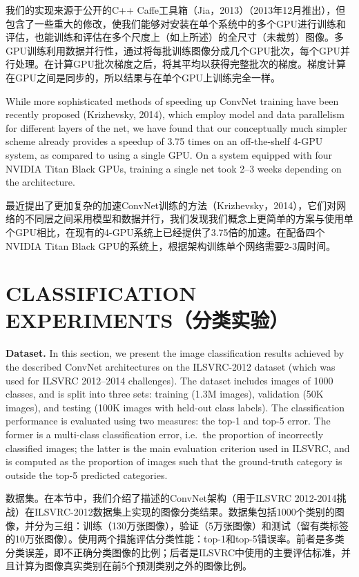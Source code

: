 \documentclass[12pt,a4paper,UTF8,twoside]{book}
\begin{document}
我们的实现来源于公开的C++ Caffe工具箱（Jia，2013）（2013年12月推出），但包含了一些重大的修改，使我们能够对安装在单个系统中的多个GPU进行训练和评估，也能训练和评估在多个尺度上（如上所述）的全尺寸（未裁剪）图像。多GPU训练利用数据并行性，通过将每批训练图像分成几个GPU批次，每个GPU并行处理。在计算GPU批次梯度之后，将其平均以获得完整批次的梯度。梯度计算在GPU之间是同步的，所以结果与在单个GPU上训练完全一样。

While more sophisticated methods of speeding up ConvNet training have been recently proposed (Krizhevsky, 2014), which employ model and data parallelism for different layers of the net, we have found that our conceptually much simpler scheme already provides a speedup of 3.75 times on an off-the-shelf 4-GPU system, as compared to using a single GPU. On a system equipped with four NVIDIA Titan Black GPUs, training a single net took 2--3 weeks depending on the architecture.

最近提出了更加复杂的加速ConvNet训练的方法（Krizhevsky，2014），它们对网络的不同层之间采用模型和数据并行，我们发现我们概念上更简单的方案与使用单个GPU相比，在现有的4-GPU系统上已经提供了3.75倍的加速。在配备四个NVIDIA Titan Black GPU的系统上，根据架构训练单个网络需要2-3周时间。

\hypertarget{classification-experimentsux5206ux7c7bux5b9eux9a8c}{%
\section{CLASSIFICATION EXPERIMENTS（分类实验）}\label{classification-experimentsux5206ux7c7bux5b9eux9a8c}}

\textbf{Dataset.} In this section, we present the image classification results achieved by the described ConvNet architectures on the ILSVRC-2012 dataset (which was used for ILSVRC 2012--2014 challenges). The dataset includes images of 1000 classes, and is split into three sets: training (1.3M images), validation (50K images), and testing (100K images with held-out class labels). The classification performance is evaluated using two measures: the top-1 and top-5 error. The former is a multi-class classification error, i.e.~the proportion of incorrectly classified images; the latter is the main evaluation criterion used in ILSVRC, and is computed as the proportion of images such that the ground-truth category is outside the top-5 predicted categories.

数据集。在本节中，我们介绍了描述的ConvNet架构（用于ILSVRC 2012-2014挑战）在ILSVRC-2012数据集上实现的图像分类结果。数据集包括1000个类别的图像，并分为三组：训练（130万张图像），验证（5万张图像）和测试（留有类标签的10万张图像）。使用两个措施评估分类性能：top-1和top-5错误率。前者是多类分类误差，即不正确分类图像的比例；后者是ILSVRC中使用的主要评估标准，并且计算为图像真实类别在前5个预测类别之外的图像比例。
\end{document}
